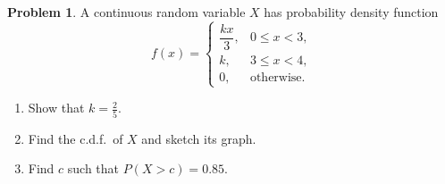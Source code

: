 \documentclass[12pt,a4paper]{report}
\theoremstyle{definition}
\theoremstyle{plain}
\theoremstyle{definition}
\newtheorem{problemx}{Problem}[section]
\newenvironment{problem}{\begin{problemx}}{\end{problemx}}
\begin{document}
\begin{problem}
A continuous random variable $X$ has probability density function
\[f(x) = \begin{cases}
\dfrac{kx}{3}, & 0\leq x<3,\\[4pt]
k, & 3\leq x<4,\\[2pt]
0, & \text{otherwise.}
\end{cases}\]
\begin{enumerate}
\item[(a).] Show that $k = \frac{2}{5}$.
\item[(b).] Find the c.d.f.\ of $X$ and sketch its graph.
\item[(c).] Find $c$ such that $P(X>c) = 0.85$.
\end{enumerate}
\end{problem}
\end{document}
